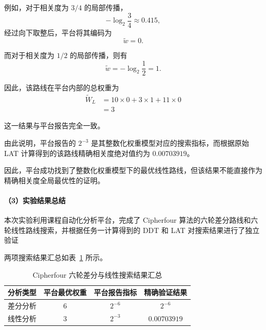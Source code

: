 例如，对于相关度为 $3/4$ 的局部传播，
\[
-\log_2\frac34\approx0.415,
\]
经过向下取整后，平台将其编码为
\[
\widetilde{w}=0.
\]

而对于相关度为 $1/2$ 的局部传播，则有
\[
\widetilde{w}
=-\log_2\frac12
=1.
\]

因此，该路线在平台内部的总权重为
\[
\begin{aligned}
\widetilde{W}_L
&=10\times0+3\times1+11\times0\\
&=3
\end{aligned}
\]

这一结果与平台报告完全一致。

由此说明，平台报告的 $2^{-3}$ 是其整数化权重模型对应的搜索指标，而根据原始 LAT 计算得到的该路线精确相关度绝对值约为 $0.00703919$。

因此，平台成功找到了整数化权重模型下的最优线性路线，但该结果不能直接作为精确相关度全局最优性的证明。

\paragraph{（3）实验结果总结}

本次实验利用课程自动化分析平台，完成了 Cipherfour 算法的六轮差分路线和六轮线性路线搜索，并根据任务一计算得到的 DDT 和 LAT 对搜索结果进行了独立验证

两项搜索结果汇总如表~\ref{tab:cipherfour-summary} 所示。

\begin{table}[H]
\centering
\caption{Cipherfour 六轮差分与线性搜索结果汇总}
\label{tab:cipherfour-summary}
\begin{tabular}{c|c|c|c}
\hline
分析类型 & 平台最优权重 & 平台报告指标 & 精确验证结果 \\
\hline
差分分析 & $6$ & $2^{-6}$ & $2^{-6}$ \\
线性分析 & $3$ & $2^{-3}$ & $0.00703919$ \\
\hline
\end{tabular}
\end{table}
